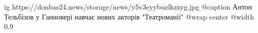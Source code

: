  
 
 
 
 

\ifcmt
  ig https://donbas24.news/storage/news/y5v3eyybuzlkzzyg.jpg
	@caption Антон Тельбізов у Ганновері навчає нових акторів "Театроманії"
  @wrap center
  @width 0.9
\fi
